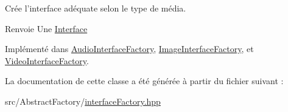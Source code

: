 Crée l'interface adéquate selon le type de média. 

\begin{DoxyReturn}{Renvoie}
Une \hyperlink{classInterface}{Interface} 
\end{DoxyReturn}


Implémenté dans \hyperlink{classAudioInterfaceFactory_ad5367033861d4aadd1ad0b0f5fa1caeb}{Audio\+Interface\+Factory}, \hyperlink{classImageInterfaceFactory_ace6a51fa023edcf9c99aee2a7e74ca5a}{Image\+Interface\+Factory}, et \hyperlink{classVideoInterfaceFactory_ac0470dfd9d2685893c62ec922496a9bf}{Video\+Interface\+Factory}.



La documentation de cette classe a été générée à partir du fichier suivant \+:\begin{DoxyCompactItemize}
\item 
src/\+Abstract\+Factory/\hyperlink{interfaceFactory_8hpp}{interface\+Factory.\+hpp}\end{DoxyCompactItemize}
